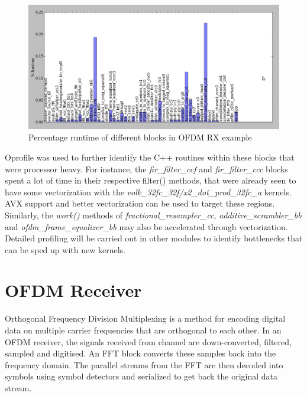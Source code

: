 \documentclass[a4paper,12pt,oneside]{article}
\begin{document}
\begin{figure} 
\centering\includegraphics[width=5in]{figure/ofdm_rx.png}
\caption{Percentage runtime of different blocks in OFDM RX example \label{fig:1} }
\end{figure}

Oprofile \cite{oprofile} was used to further identify the C++ routines within these blocks that were processor heavy. For instance, the {\it fir\_filter\_ccf} and {\it fir\_filter\_ccc} blocks spent a lot of time in their respective filter() methods, that were already seen to have some vectorization with the {\it volk\_32fc\_32f/x2\_dot\_prod\_32fc\_a} kernels. AVX support and better vectorization can be used to target these regions. Similarly, the {\it work()} methods of {\it fractional\_resampler\_cc}, {\it additive\_scrambler\_bb} and {\it ofdm\_frame\_equalizer\_bb} may also be accelerated through vectorization. Detailed profiling will be carried out in other modules to identify bottlenecks that can be sped up with new kernels. 

\section{OFDM Receiver}
Orthogonal Frequency Division Multiplexing is a method for encoding digital data on multiple carrier frequencies that are orthogonal to each other. In an OFDM receiver, the signals received from channel are down-converted, filtered, sampled and digitised. An FFT block converts these samples back into the frequency domain. The parallel streams from the FFT are then decoded into symbols using symbol detectors and serialized to get back the original data stream. \\
\end{document}
